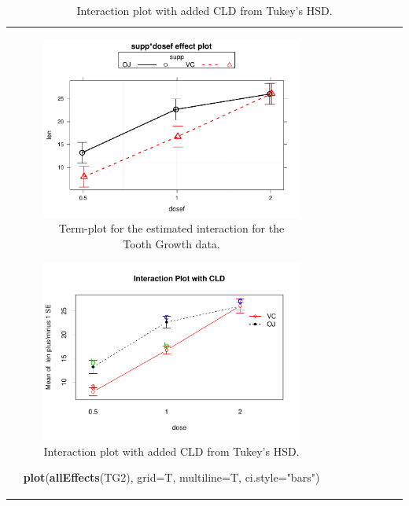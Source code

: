 \documentclass[]{book}
\newenvironment{Shaded}{\begin{snugshade}}{\end{snugshade}}
\newcommand{\KeywordTok}[1]{\textcolor[rgb]{0.13,0.29,0.53}{\textbf{#1}}}
\newcommand{\DataTypeTok}[1]{\textcolor[rgb]{0.13,0.29,0.53}{#1}}
\newcommand{\StringTok}[1]{\textcolor[rgb]{0.31,0.60,0.02}{#1}}
\newcommand{\NormalTok}[1]{#1}
\theoremstyle{definition}
\theoremstyle{definition}
\theoremstyle{remark}
\begin{document}
\begin{longtable}[]{@{}ccccccc@{}}
\begin{minipage}[b]{0.10\columnwidth}
\begin{Shaded}
\begin{Highlighting}[]
\begin{Shaded}
\begin{Highlighting}[]
\begin{Shaded}
\begin{Highlighting}[]
\begin{figure}
\centering
\includegraphics{04-twoWayAnova_files/figure-latex/Figure4-10-1.pdf}
\caption{\label{fig:Figure4-10}Term-plot for the estimated interaction for the Tooth
Growth data.}
\end{figure}



\begin{figure}
\centering
\includegraphics{04-twoWayAnova_files/figure-latex/Figure4-11-1.pdf}
\caption{\label{fig:Figure4-11}Interaction plot with added CLD from Tukey's HSD.}
\end{figure}

\begin{Shaded}
\begin{Highlighting}[]
\KeywordTok{plot}\NormalTok{(}\KeywordTok{allEffects}\NormalTok{(TG2), }\DataTypeTok{grid=}\NormalTok{T, }\DataTypeTok{multiline=}\NormalTok{T, }\DataTypeTok{ci.style=}\StringTok{"bars"}\NormalTok{)}
\end{Highlighting}
\end{Shaded}


\end{Highlighting}
\end{Shaded}
\end{Highlighting}
\end{Shaded}
\end{Highlighting}
\end{Shaded}
\end{minipage}
\end{longtable}
\end{document}
